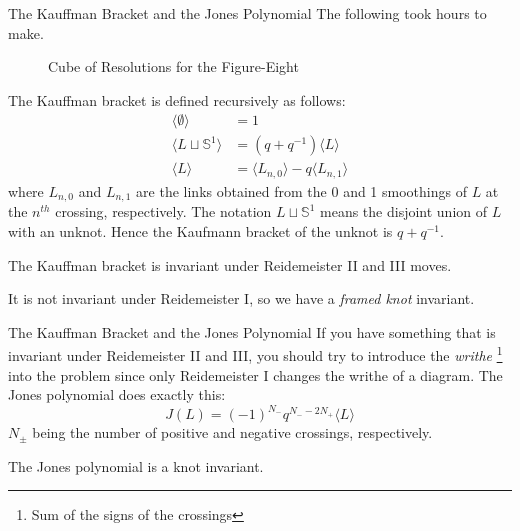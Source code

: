 \documentclass{beamer}
\begin{document}
    \begin{frame}{The Kauffman Bracket and the Jones Polynomial}
        The following took hours to make.
        \begin{figure}
            \centering
            \caption{Cube of Resolutions for the Figure-Eight}
            \label{fig:figure_eight_knot_cube_of_resolutions}
        \end{figure}
    \end{frame}
    \begin{frame}
        The Kauffman bracket is defined recursively as follows:
        \begin{align}
            \langle\emptyset\rangle&=1\\
            \langle{L\sqcup\mathbb{S}^{1}}\rangle&=(q+q^{-1})\langle{L}\rangle\\
            \langle{L}\rangle&=
                \langle{L_{n,0}}\rangle-q\langle{L_{n,1}}\rangle
        \end{align}
        where $L_{n,0}$ and $L_{n,1}$ are the links obtained from the
        0 and 1 smoothings of $L$ at the $n^{th}$ crossing, respectively. The
        notation $L\sqcup\mathbb{S}^{1}$ means the disjoint union of
        $L$ with an unknot. Hence the Kaufmann bracket of the
        unknot is $q+q^{-1}$.
        \begin{theorem}
            The Kauffman bracket is invariant under Reidemeister II and III
            moves.
        \end{theorem}
        It is not invariant under Reidemeister I, so we have a
        \textit{framed knot} invariant.
    \end{frame}
    \begin{frame}{The Kauffman Bracket and the Jones Polynomial}
        If you have something that is invariant under Reidemeister II and III,
        you should try to introduce the \textit{writhe}%
        \footnote{Sum of the signs of the crossings}
        into the problem since only Reidemeister I changes the writhe of a
        diagram. The Jones polynomial does exactly this:
        \begin{equation}
            J(L)=(-1)^{N_{-}}q^{N_{-}-2N_{+}}\langle{L}\rangle
        \end{equation}
        $N_{\pm}$ being the number of positive and negative crossings,
        respectively.
        \begin{theorem}
            The Jones polynomial is a knot invariant.
        \end{theorem}
    \end{frame}
\end{document}

